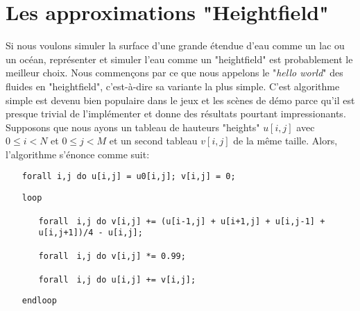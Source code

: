 \documentclass[11pt]{report}
\begin{document}
\chapter{Les approximations "Heightfield"} \label{chap:heightfield-approx}

Si nous voulons simuler la surface d'une grande étendue d'eau comme un lac ou un océan, représenter et simuler l'eau comme un "heightfield" est probablement le meilleur choix. Nous commençons par ce que nous appelons le "\textit{hello world}" des fluides en "heightfield", c'est-à-dire sa variante la plus simple. C'est algorithme simple est devenu bien populaire dans le jeux et les scènes de démo parce qu'il est presque trivial de l'implémenter et donne des résultats pourtant impressionants. Supposons que nous ayons un tableau de hauteurs "heights" $u[i,j]$ avec $0 \leq i < N$ et $0 \leq j < M$ et un second tableau $v[i,j]$ de la même taille. Alors, l'algorithme s'énonce comme suit:\newline

\begin{itemize}

\item[\texttt{forall i,j do u[i,j] = u0[i,j]; v[i,j] = 0;}]

\item[\texttt{loop}]

	\begin{itemize}
		\item[ ]
		\item[\texttt{forall}]\texttt{ i,j do v[i,j] += (u[i-1,j] + u[i+1,j] + u[i,j-1] + u[i,j+1])/4 - u[i,j];}
	
		\item[\texttt{forall}]\texttt{ i,j do v[i,j] *= 0.99;}
	
		\item[\texttt{forall}]\texttt{ i,j do u[i,j] += v[i,j];}
	
	\end{itemize}

\item[\texttt{endloop}]

\end{itemize} 
\vspace{2em}
\end{document}

